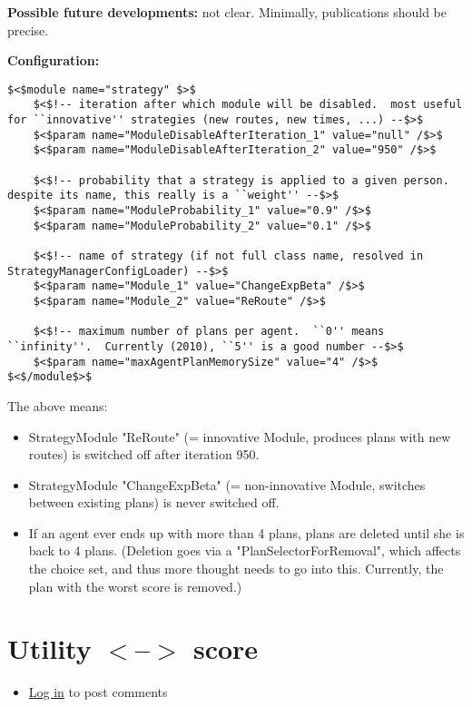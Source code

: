 \documentclass[a4paper,11pt]{report}
\begin{document}
\textbf{Possible future developments:} not clear. Minimally, publications should be precise.

\textbf{Configuration:}
\begin{verbatim}
$<$module name="strategy" $>$
	$<$!-- iteration after which module will be disabled.  most useful for ``innovative'' strategies (new routes, new times, ...) --$>$
	$<$param name="ModuleDisableAfterIteration_1" value="null" /$>$
	$<$param name="ModuleDisableAfterIteration_2" value="950" /$>$

	$<$!-- probability that a strategy is applied to a given person.  despite its name, this really is a ``weight'' --$>$
	$<$param name="ModuleProbability_1" value="0.9" /$>$
	$<$param name="ModuleProbability_2" value="0.1" /$>$

	$<$!-- name of strategy (if not full class name, resolved in StrategyManagerConfigLoader) --$>$
	$<$param name="Module_1" value="ChangeExpBeta" /$>$
	$<$param name="Module_2" value="ReRoute" /$>$

	$<$!-- maximum number of plans per agent.  ``0'' means ``infinity''.  Currently (2010), ``5'' is a good number --$>$
	$<$param name="maxAgentPlanMemorySize" value="4" /$>$
$<$/module$>$
\end{verbatim}

The above means:
\begin{itemize}
	\item StrategyModule "ReRoute" (= innovative Module, produces plans with new routes) is switched off after iteration 950.
	\item StrategyModule "ChangeExpBeta" (= non-innovative Module, switches between existing plans) is never switched off.
	\item If an agent ever ends up with more than 4 plans, plans are deleted  until she is back to 4 plans. (Deletion goes via a  "PlanSelectorForRemoval", which affects the choice set, and thus more  thought needs to go into this. Currently, the plan with the worst  score is removed.)
\end{itemize}

\vfill\eject
\section{Utility $<$--$>$ score}
\begin{itemize}
	\item \href{http://www.matsim.org/user/login?destination=comment/reply/544%23comment-form}{Log in} to post comments
\end{itemize}
\end{document}
